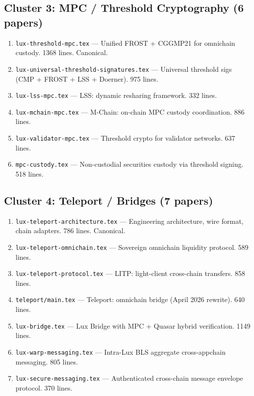 \documentclass[11pt,a4paper]{article}
\begin{document}
\subsection{Cluster 3: MPC / Threshold Cryptography (6 papers)}
\begin{enumerate}[leftmargin=2em]
\item \texttt{lux-threshold-mpc.tex} --- Unified FROST + CGGMP21 for omnichain custody. 1368 lines. Canonical.
\item \texttt{lux-universal-threshold-signatures.tex} --- Universal threshold sigs (CMP + FROST + LSS + Doerner). 975 lines.
\item \texttt{lux-lss-mpc.tex} --- LSS: dynamic resharing framework. 332 lines.
\item \texttt{lux-mchain-mpc.tex} --- M-Chain: on-chain MPC custody coordination. 886 lines.
\item \texttt{lux-validator-mpc.tex} --- Threshold crypto for validator networks. 637 lines.
\item \texttt{mpc-custody.tex} --- Non-custodial securities custody via threshold signing. 518 lines.
\end{enumerate}

\subsection{Cluster 4: Teleport / Bridges (7 papers)}
\begin{enumerate}[leftmargin=2em]
\item \texttt{lux-teleport-architecture.tex} --- Engineering architecture, wire format, chain adapters. 786 lines. Canonical.
\item \texttt{lux-teleport-omnichain.tex} --- Sovereign omnichain liquidity protocol. 589 lines.
\item \texttt{lux-teleport-protocol.tex} --- LITP: light-client cross-chain transfers. 858 lines.
\item \texttt{teleport/main.tex} --- Teleport: omnichain bridge (April 2026 rewrite). 640 lines.
\item \texttt{lux-bridge.tex} --- Lux Bridge with MPC + Quasar hybrid verification. 1149 lines.
\item \texttt{lux-warp-messaging.tex} --- Intra-Lux BLS aggregate cross-appchain messaging. 805 lines.
\item \texttt{lux-secure-messaging.tex} --- Authenticated cross-chain message envelope protocol. 370 lines.
\end{enumerate}
\end{document}
